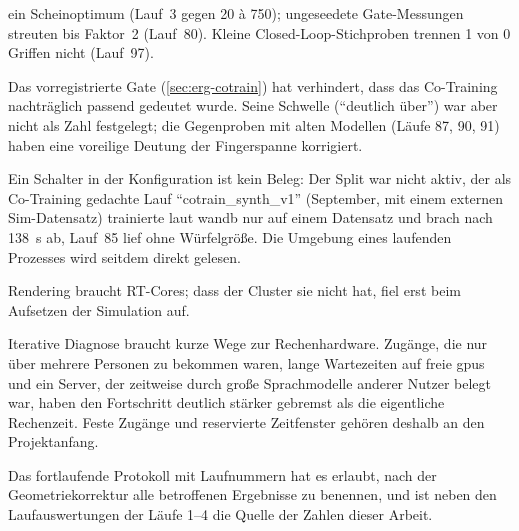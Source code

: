 \begin{description}
    ein Scheinoptimum (Lauf~3 gegen 20 à 750); ungeseedete Gate-Messungen streuten bis Faktor~2
    (Lauf~80). Kleine Closed-Loop-Stichproben trennen 1 von 0 Griffen nicht (Lauf~97).
  \item[Regeln vorab festlegen, als Zahl.] Das vorregistrierte Gate (\cref{sec:erg-cotrain})
    hat verhindert, dass das Co-Training nachträglich passend gedeutet wurde. Seine Schwelle
    (\enquote{deutlich über}) war aber nicht als Zahl festgelegt; die Gegenproben mit
    alten Modellen (Läufe 87, 90, 91) haben eine voreilige Deutung der Fingerspanne korrigiert.
  \item[Konfiguration am laufenden Prozess prüfen.] Ein Schalter in der Konfiguration ist kein
    Beleg: Der Split war nicht aktiv, der als Co-Training gedachte Lauf \enquote{cotrain\_synth\_v1}
    (September, mit einem externen Sim-Datensatz) trainierte laut \ac{wandb} nur auf einem
    Datensatz und brach nach 138~s ab, Lauf~85
    lief ohne Würfelgröße. Die Umgebung eines laufenden Prozesses wird seitdem direkt gelesen.
  \item[Hardware je Teilaufgabe vorab klären.] Rendering braucht RT-Cores; dass der Cluster sie
    nicht hat, fiel erst beim Aufsetzen der Simulation auf.
  \item[Ressourcen dauerhaft und direkt verfügbar machen.] Iterative Diagnose braucht kurze
    Wege zur Rechenhardware. Zugänge, die nur über mehrere Personen zu bekommen waren, lange
    Wartezeiten auf freie \acsp{gpu} und ein Server, der zeitweise durch große Sprachmodelle
    anderer Nutzer belegt war, haben den Fortschritt deutlich stärker gebremst als die
    eigentliche Rechenzeit. Feste Zugänge und reservierte Zeitfenster gehören deshalb an den
    Projektanfang.
  \item[Laborbuch führen.] Das fortlaufende Protokoll mit Laufnummern hat es erlaubt, nach der
    Geometriekorrektur alle betroffenen Ergebnisse zu benennen, und ist neben den
    Laufauswertungen der Läufe 1--4 die Quelle der Zahlen dieser Arbeit.
\end{description}

